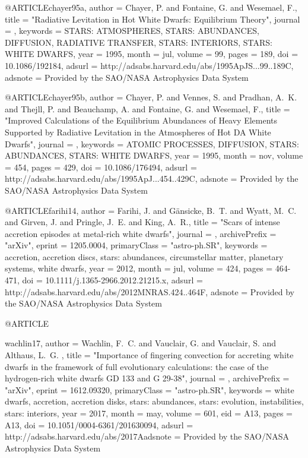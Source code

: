 \documentclass[a4paper,fleqn,usenatbib]{mnras}
\begin{document}
{{{{{@ARTICLE{chayer95a,
   author = {{Chayer}, P. and {Fontaine}, G. and {Wesemael}, F.},
    title = "{Radiative Levitation in Hot White Dwarfs: Equilibrium Theory}",
  journal = {\apjs},
 keywords = {STARS: ATMOSPHERES, STARS: ABUNDANCES, DIFFUSION, RADIATIVE TRANSFER, STARS: INTERIORS, STARS: WHITE DWARFS},
     year = 1995,
    month = jul,
   volume = 99,
    pages = {189},
      doi = {10.1086/192184},
   adsurl = {http://adsabs.harvard.edu/abs/1995ApJS...99..189C},
  adsnote = {Provided by the SAO/NASA Astrophysics Data System}
}


@ARTICLE{chayer95b,
   author = {{Chayer}, P. and {Vennes}, S. and {Pradhan}, A.~K. and {Thejll}, P. and 
	{Beauchamp}, A. and {Fontaine}, G. and {Wesemael}, F.},
    title = "{Improved Calculations of the Equilibrium Abundances of Heavy Elements Supported by Radiative Levitation in the Atmospheres of Hot DA White Dwarfs}",
  journal = {\apj},
 keywords = {ATOMIC PROCESSES, DIFFUSION, STARS: ABUNDANCES, STARS: WHITE DWARFS},
     year = 1995,
    month = nov,
   volume = 454,
    pages = {429},
      doi = {10.1086/176494},
   adsurl = {http://adsabs.harvard.edu/abs/1995ApJ...454..429C},
  adsnote = {Provided by the SAO/NASA Astrophysics Data System}
}


@ARTICLE{farihi14,
   author = {{Farihi}, J. and {G{\"a}nsicke}, B.~T. and {Wyatt}, M.~C. and 
	{Girven}, J. and {Pringle}, J.~E. and {King}, A.~R.},
    title = "{Scars of intense accretion episodes at metal-rich white dwarfs}",
  journal = {\mnras},
archivePrefix = "arXiv",
   eprint = {1205.0004},
 primaryClass = "astro-ph.SR",
 keywords = {accretion, accretion discs, stars: abundances, circumstellar matter, planetary systems, white dwarfs},
     year = 2012,
    month = jul,
   volume = 424,
    pages = {464-471},
      doi = {10.1111/j.1365-2966.2012.21215.x},
   adsurl = {http://adsabs.harvard.edu/abs/2012MNRAS.424..464F},
  adsnote = {Provided by the SAO/NASA Astrophysics Data System}
}

@ARTICLE{wachlin17,
   author = {{Wachlin}, F.~C. and {Vauclair}, G. and {Vauclair}, S. and {Althaus}, L.~G.
	},
    title = "{Importance of fingering convection for accreting white dwarfs in the framework of full evolutionary calculations: the case of the hydrogen-rich white dwarfs GD 133 and G 29-38}",
  journal = {\aap},
archivePrefix = "arXiv",
   eprint = {1612.09320},
 primaryClass = "astro-ph.SR",
 keywords = {white dwarfs, accretion, accretion disks, stars: abundances, stars: evolution, instabilities, stars: interiors},
     year = 2017,
    month = may,
   volume = 601,
      eid = {A13},
    pages = {A13},
      doi = {10.1051/0004-6361/201630094},
   adsurl = {http://adsabs.harvard.edu/abs/2017Aadsnote = {Provided by the SAO/NASA Astrophysics Data System}
}




}}}}}}
\end{document}
